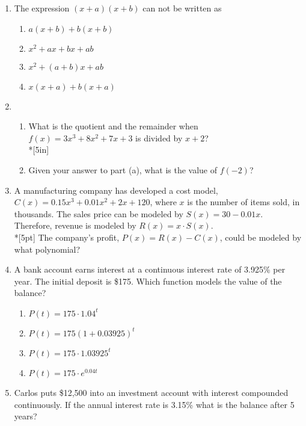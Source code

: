 \documentclass[12pt, oneside]{article}
\begin{document}
\begin{enumerate}

\item The expression $(x + a)(x + b)$ can not be written as
\begin{enumerate}
    \item $a(x + b)+ b(x + b)$
    \item $x^2 + ax + bx + ab$ 
    \item  $x^2 + (a + b)x + ab$  
    \item $x(x + a)+ b(x + a)$
\end{enumerate}

\item 
\begin{enumerate}
    \item What is the quotient and the remainder when $f(x)=3x^3+8x^2+7x+3$ is divided by $x+2$?\\*[5in]
    \item Given your answer to part (a), what is the value of $f(-2)$?
\end{enumerate}

\item A manufacturing company has developed a cost model, $C(x)=0.15x^3+0.01x^2+2x+120$, where $x$ is the number of items sold, in thousands. The sales price can be modeled by $S(x)=30-0.01x$. Therefore, revenue is modeled by $R(x)=x \cdot S(x)$.\\*[5pt]
The company’s profit, $P(x)=R(x)-C(x)$, could be modeled by what polynomial?  %

\newpage

\item A bank account earns interest at a continuous interest rate of 3.925\% per year. The initial deposit is \$175. Which function models the value of the balance?
\begin{enumerate}
    \item $P(t)=175 \cdot 1.04^{t}$
    \item $P(t)=175 (1+0.03925)^{t}$
    \item $P(t)=175 \cdot 1.03925^{t}$
    \item $P(t)=175 \cdot e^{0.04t}$
\end{enumerate}

\item Carlos puts \$12,500 into an investment account with interest compounded continuously. If the annual interest rate is 3.15\% what is the balance after 5 years?\\[80pt]



\end{enumerate}
\end{document}
